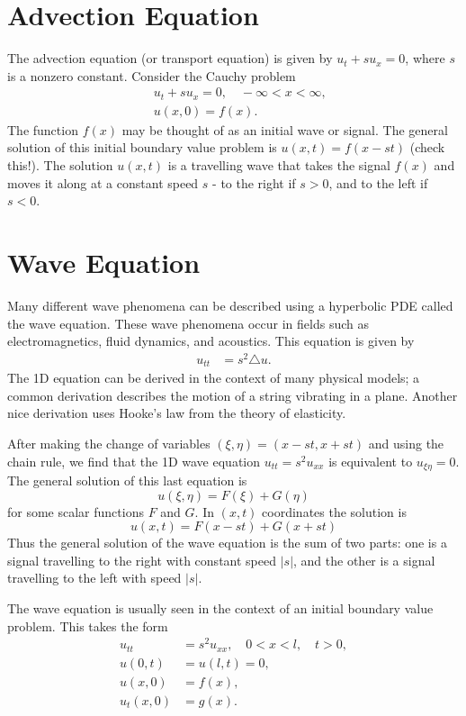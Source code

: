 \label{lab:waveeqn}

\section*{Advection Equation}
The advection equation (or transport equation) is given by $u_t + s u_x = 0$, where $s$ is a nonzero constant.
Consider the Cauchy problem
\begin{align*}
	& u_t + su_x = 0, \quad -\infty < x < \infty,\\\
	& u(x,0) = f(x).
\end{align*}
The function $f(x)$ may be thought of as an initial wave or signal.
The general solution of this initial boundary value problem is $u(x,t) = f(x-st)$ (check this!).
The solution $u(x,t)$ is a travelling wave that takes the signal $f(x)$ and moves it along at a constant speed $s$ - to the right if $s > 0$, and to the left if $s < 0$.

\section*{Wave Equation}
Many different wave phenomena can be described using a hyperbolic PDE called the wave equation.
These wave phenomena occur in fields such as electromagnetics, fluid dynamics, and acoustics.
This equation is given by
\begin{align}
	u_{tt} &= s^2 \triangle u.
\end{align}
The 1D equation can be derived in the context of many physical models; a common derivation describes the motion of a string vibrating in a plane.
Another nice derivation uses Hooke's law from the theory of elasticity.

After making the change of variables $(\xi,\eta) = (x-st, x + st)$ and using the chain rule, we find that the 1D wave equation $u_{tt} = s^2 u_{xx}$ is equivalent to $u_{\xi \eta} = 0$.
The general solution of this last equation is
\[u(\xi, \eta) = F(\xi) + G(\eta)\]
for some scalar functions $F$ and $G$.
In $(x,t)$ coordinates the solution is
\[u(x,t) = F(x-st) + G(x+st)\]
Thus the general solution of the wave equation is the sum of two parts: one is a signal travelling to the right with constant speed $|s|$, and the other is a signal travelling to the left with speed $|s|$.

The wave equation is usually seen in the context of an initial boundary value problem.
This takes the form
\begin{align*}
	u_{tt} &= s^2 u_{xx}, \quad 0 < x < l, \quad t > 0,\\
	u(0,t) &= u(l,t) = 0, \\
	u(x,0) &= f(x),\\
	u_t(x,0) &= g(x).
\end{align*}

